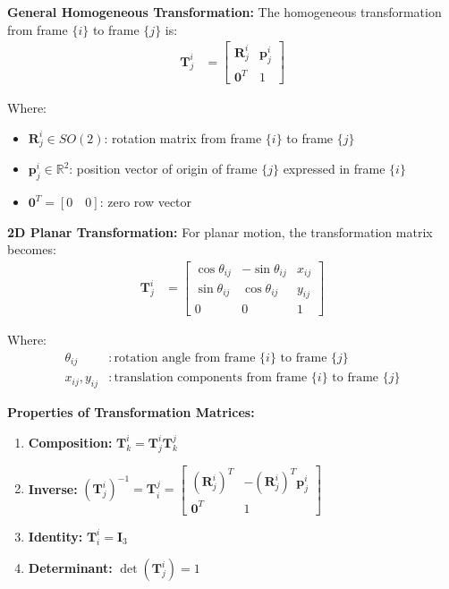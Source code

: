 \documentclass[11pt,a4paper]{article}
\begin{document}
\textbf{General Homogeneous Transformation:}
The homogeneous transformation from frame $\{i\}$ to frame $\{j\}$ is:
\begin{align}
\bm{T}_j^i &= \begin{bmatrix}
\bm{R}_j^i & \bm{p}_j^i \\
\bm{0}^T & 1
\end{bmatrix}
\end{align}

Where:
\begin{itemize}
    \item $\bm{R}_j^i \in SO(2)$: rotation matrix from frame $\{i\}$ to frame $\{j\}$
    \item $\bm{p}_j^i \in \mathbb{R}^2$: position vector of origin of frame $\{j\}$ expressed in frame $\{i\}$
    \item $\bm{0}^T = [0 \quad 0]$: zero row vector
\end{itemize}

\textbf{2D Planar Transformation:}
For planar motion, the transformation matrix becomes:
\begin{align}
\bm{T}_j^i &= \begin{bmatrix}
\cos\theta_{ij} & -\sin\theta_{ij} & x_{ij} \\
\sin\theta_{ij} & \cos\theta_{ij} & y_{ij} \\
0 & 0 & 1
\end{bmatrix}
\end{align}

Where:
\begin{align}
\theta_{ij} &: \text{rotation angle from frame } \{i\} \text{ to frame } \{j\} \\
x_{ij}, y_{ij} &: \text{translation components from frame } \{i\} \text{ to frame } \{j\}
\end{align}

\textbf{Properties of Transformation Matrices:}
\begin{enumerate}
    \item \textbf{Composition:} $\bm{T}_k^i = \bm{T}_j^i \bm{T}_k^j$
    \item \textbf{Inverse:} $(\bm{T}_j^i)^{-1} = \bm{T}_i^j = \begin{bmatrix} (\bm{R}_j^i)^T & -(\bm{R}_j^i)^T \bm{p}_j^i \\ \bm{0}^T & 1 \end{bmatrix}$
    \item \textbf{Identity:} $\bm{T}_i^i = \bm{I}_3$
    \item \textbf{Determinant:} $\det(\bm{T}_j^i) = 1$
\end{enumerate}
\end{document}
